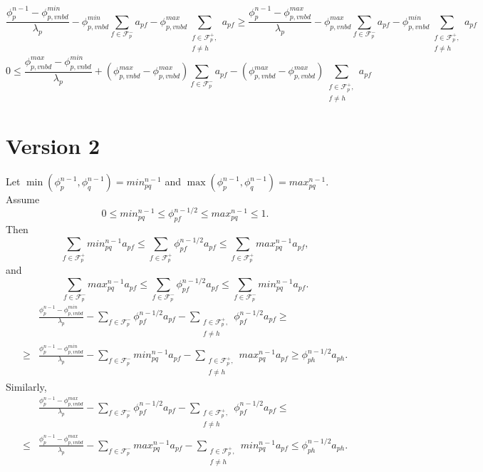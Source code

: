 \documentclass[../thesis.tex]{subfiles}
\begin{document}
\[
	\frac{\phi_p^{n-1} - \phi_{p,vnbd}^{min}}{\lambda_p}
		- \phi_{p,vnbd}^{min}\sum_{f \in \mathcal{F}_p^-} a_{pf}
		- \phi_{p,vnbd}^{max}\sum_{
			\substack{
				f \in \mathcal{F}_p^+, \\
				f \neq h}
				} a_{pf}
	\geq
	\frac{\phi_p^{n-1} - \phi_{p,vnbd}^{max}}{\lambda_p}
		- \phi_{p,vnbd}^{max}\sum_{f \in \mathcal{F}_p^-} a_{pf}
		- \phi_{p,vnbd}^{min}\sum_{
			\substack{
				f \in \mathcal{F}_p^+, \\
				f \neq h}
				} a_{pf}
\]
\[
	0 \leq
	\frac{\phi_{p,vnbd}^{max} - \phi_{p,vnbd}^{min}}{\lambda_p}
	+ \left(
		\phi_{p,vnbd}^{max} - \phi_{p,vnbd}^{max}
	\right)\sum_{f \in \mathcal{F}_p^-} a_{pf}
	- \left(
		\phi_{p,vnbd}^{max} - \phi_{p,vnbd}^{max}
	\right)\sum_{
		\substack{
			f \in \mathcal{F}_p^+, \\
			f \neq h}
			} a_{pf}
\]
\section{Version 2}
Let \( \min(\phi_p^{n-1}, \phi_q^{n-1}) = min_{pq}^{n-1} \) and \( \max(\phi_p^{n-1}, \phi_q^{n-1}) = max_{pq}^{n-1} \).
Assume
\[ 0 \leq min_{pq}^{n-1} \leq  \phi_{pf}^{n-1/2} \leq max_{pq}^{n-1} \leq 1.\]
Then
\[
	\sum_{f \in \mathcal{F}_p^+}min_{pq}^{n-1} a_{pf}
	\leq
	\sum_{f \in \mathcal{F}_p^+} \phi_{pf}^{n-1/2} a_{pf}
	\leq
	\sum_{f \in \mathcal{F}_p^+}max_{pq}^{n-1} a_{pf},
\]
and
\[
	\sum_{f \in \mathcal{F}_p^-}max_{pq}^{n-1} a_{pf}
	\leq
	\sum_{f \in \mathcal{F}_p^-} \phi_{pf}^{n-1/2} a_{pf}
	\leq
	\sum_{f \in \mathcal{F}_p^-}min_{pq}^{n-1} a_{pf}.
\]
\begin{equation*}
	\begin{split}
		&\frac{\phi_p^{n-1} - \phi_{p,vnbd}^{min}}{\lambda_p}
		- \sum_{f \in \mathcal{F}_p^-} \phi_{pf}^{n-1/2} a_{pf}
		- \sum_{
			\substack{
				f \in \mathcal{F}_p^+, \\
				f \neq h}
				} \phi_{pf}^{n-1/2} a_{pf}
		\geq\\
		\geq
		&\frac{\phi_p^{n-1} - \phi_{p,vnbd}^{min}}{\lambda_p}
		- \sum_{f \in \mathcal{F}_p^-} min_{pq}^{n-1} a_{pf}
		- \sum_{
			\substack{
				f \in \mathcal{F}_p^+, \\
				f \neq h}
				} max_{pq}^{n-1} a_{pf}
		\geq
		\phi_{ph}^{n-1/2} a_{ph}.
	\end{split}
\end{equation*}
Similarly,
\begin{equation*}
	\begin{split}
		&\frac{\phi_p^{n-1} - \phi_{p,vnbd}^{max}}{\lambda_p}
		- \sum_{f \in \mathcal{F}_p^-} \phi_{pf}^{n-1/2} a_{pf}
		- \sum_{
			\substack{
				f \in \mathcal{F}_p^+, \\
				f \neq h}
				} \phi_{pf}^{n-1/2} a_{pf}
		\leq\\
		\leq
		&\frac{\phi_p^{n-1} - \phi_{p,vnbd}^{max}}{\lambda_p}
		- \sum_{f \in \mathcal{F}_p^-}max_{pq}^{n-1} a_{pf}
		- \sum_{
			\substack{
				f \in \mathcal{F}_p^+, \\
				f \neq h}
				}min_{pq}^{n-1} a_{pf}
		\leq
		\phi_{ph}^{n-1/2} a_{ph}.
	\end{split}
\end{equation*}
\end{document}
